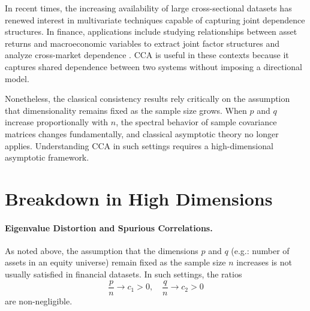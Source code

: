 \documentclass[12pt]{report} %
\begin{document}
In recent times, the increasing availability of large cross-sectional datasets has renewed 
interest in multivariate techniques capable of capturing joint dependence structures. 
In finance, applications include studying relationships between asset returns and macroeconomic variables to 
extract joint factor structures and analyze cross-market dependence \citep{FiroozyeTanZohren2023}. 
CCA is useful in these contexts because it captures shared dependence between two systems without imposing a directional model.

Nonetheless, the classical consistency results rely critically on the assumption that 
dimensionality remains fixed as the sample size grows. When $p$ and $q$ increase 
proportionally with $n$, the spectral behavior of sample covariance matrices changes fundamentally, 
and classical asymptotic theory no longer applies. Understanding CCA in such settings 
requires a high-dimensional asymptotic framework.

\section{Breakdown in High Dimensions}

\paragraph{Eigenvalue Distortion and Spurious Correlations.}


As noted above, the assumption that the dimensions $p$ and $q$ (e.g.: number of assets in an equity universe)
remain fixed as the sample size $n$ increases is not usually satisfied in financial datasets. In such settings, the ratios
\[
\frac{p}{n} \to c_1 > 0, 
\quad 
\frac{q}{n} \to c_2 > 0
\]
are non-negligible.
\end{document}
